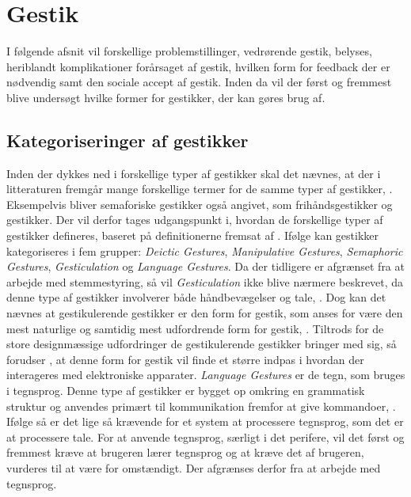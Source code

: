 \section{Gestik}
\label{Gestik}
%
I følgende afsnit vil forskellige problemstillinger, vedrørende gestik, belyses, heriblandt komplikationer forårsaget af gestik, hvilken form for feedback der er nødvendig samt den sociale accept af gestik. Inden da vil der først og fremmest blive undersøgt hvilke former for gestikker, der kan gøres brug af.  
%
\subsection{Kategoriseringer af gestikker}
\label{KategoriseringerAfGestikker}
%
Inden der dykkes ned i forskellige typer af gestikker skal det nævnes, at der i litteraturen fremgår mange forskellige termer for de samme typer af gestikker, \parencite[s. 3]{PDF:ATaxonomyOfGestures}. Eksempelvis bliver semaforiske gestikker også angivet, som frihåndsgestikker og gestikker. Der vil derfor tages udgangspunkt i, hvordan de forskellige typer af gestikker defineres, baseret på definitionerne fremsat af \textcite[ss. 4-9]{PDF:ATaxonomyOfGestures}. Ifølge \textcite[s. 4]{PDF:ATaxonomyOfGestures} kan gestikker kategoriseres i fem grupper: \textit{Deictic Gestures}, \textit{Manipulative Gestures}, \textit{Semaphoric Gestures}, \textit{Gesticulation} og \textit{Language Gestures}. \blankline
%
Da der tidligere er afgrænset fra at arbejde med stemmestyring, så vil \textit{Gesticulation} ikke blive nærmere beskrevet, da denne type af gestikker involverer både håndbevægelser og tale, \parencite[s. 7]{PDF:ATaxonomyOfGestures}. Dog kan det nævnes at gestikulerende gestikker er den form for gestik, som anses for være den mest naturlige og samtidig mest udfordrende form for gestik, \parencite[s. 7]{PDF:ATaxonomyOfGestures}. Tiltrods for de store designmæssige udfordringer de gestikulerende gestikker bringer med sig, så forudser \textcite[s. 28]{PDF:ATaxonomyOfGestures}, at denne form for gestik vil finde et større indpas i hvordan der interageres med elektroniske apparater. \blankline
%
\textit{Language Gestures} er de tegn, som bruges i tegnsprog. Denne type af gestikker er bygget op omkring en grammatisk struktur og anvendes primært til kommunikation fremfor at give kommandoer, \parencite[s. 8]{PDF:ATaxonomyOfGestures}. Ifølge \textcite[s. 8]{PDF:ATaxonomyOfGestures} så er det lige så krævende for et system at processere tegnsprog, som det er at processere tale. For at anvende tegnsprog, særligt i det perifere, vil det først og fremmest kræve at brugeren lærer tegnsprog og at kræve det af brugeren, vurderes til at være for omstændigt. Der afgrænses derfor fra at arbejde med tegnsprog. \blankline
